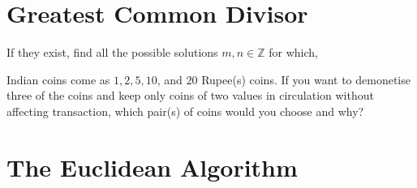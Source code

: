 \documentclass[12pt]{exam}
\begin{document}
\section{Greatest Common Divisor}
\begin{questions}
\question If they exist, find all the possible solutions $m, n \in \mathbb{Z}$ for which,
\question Indian coins come as $1, 2, 5, 10$, and $20$ Rupee(s) coins. If you want to demonetise three of the coins and keep only coins of two values in circulation without affecting transaction, which pair(s) of coins would you choose and why? 
\end{questions}

\section{The Euclidean Algorithm}
\end{document}
